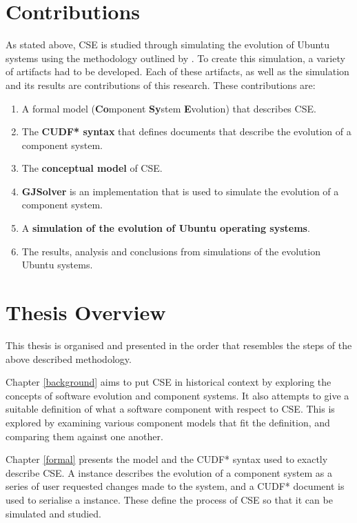 \section{Contributions}
As stated above, CSE is studied through simulating the evolution of Ubuntu systems using the methodology outlined by \cite{Law2005}.
To create this simulation, a variety of artifacts had to be developed.
Each of these artifacts, as well as the simulation and its results are contributions of this research. 
These contributions are:
\begin{enumerate}
  \item A formal model \textbf{\modelname} (\textbf{Co}mponent \textbf{Sy}stem \textbf{E}volution) that describes CSE. 
  \item The \textbf{CUDF* syntax} that defines documents that describe the evolution of a component system.
  \item The \textbf{conceptual model} of CSE.
  \item \textbf{GJSolver} is an implementation that is used to simulate the evolution of a component system.
  \item A \textbf{simulation of the evolution of Ubuntu operating systems}.
  \item The results, analysis and conclusions from simulations of the evolution Ubuntu systems.
\end{enumerate}

\section{Thesis Overview}
This thesis is organised and presented in the order that resembles the steps of the above described methodology. 

Chapter \ref{background} aims to put CSE in historical context by exploring the concepts of software evolution and component systems.
It also attempts to give a suitable definition of what a software component with respect to CSE.
This is explored by examining various component models that fit the definition, and comparing them against one another.

Chapter \ref{formal} presents the \modelname model and the CUDF* syntax used to exactly describe CSE.
A \modelname instance describes the evolution of a component system as a series of user requested changes made to the system,
and a CUDF* document is used to serialise a \modelname instance.
These define the process of CSE so that it can be simulated and studied.


